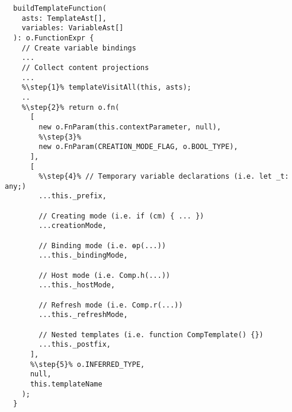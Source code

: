 \begin{verbatim}
  buildTemplateFunction(
    asts: TemplateAst[],
    variables: VariableAst[]
  ): o.FunctionExpr {
    // Create variable bindings
    ...
    // Collect content projections
    ...
    %\step{1}% templateVisitAll(this, asts);
    ..
    %\step{2}% return o.fn(
      [
        new o.FnParam(this.contextParameter, null),
        %\step{3}%
        new o.FnParam(CREATION_MODE_FLAG, o.BOOL_TYPE),
      ],
      [
        %\step{4}% // Temporary variable declarations (i.e. let _t: any;)
        ...this._prefix,

        // Creating mode (i.e. if (cm) { ... })
        ...creationMode,

        // Binding mode (i.e. ɵp(...))
        ...this._bindingMode,

        // Host mode (i.e. Comp.h(...))
        ...this._hostMode,

        // Refresh mode (i.e. Comp.r(...))
        ...this._refreshMode,

        // Nested templates (i.e. function CompTemplate() {})
        ...this._postfix,
      ],
      %\step{5}% o.INFERRED_TYPE,
      null,
      this.templateName
    );
  }
\end{verbatim}
